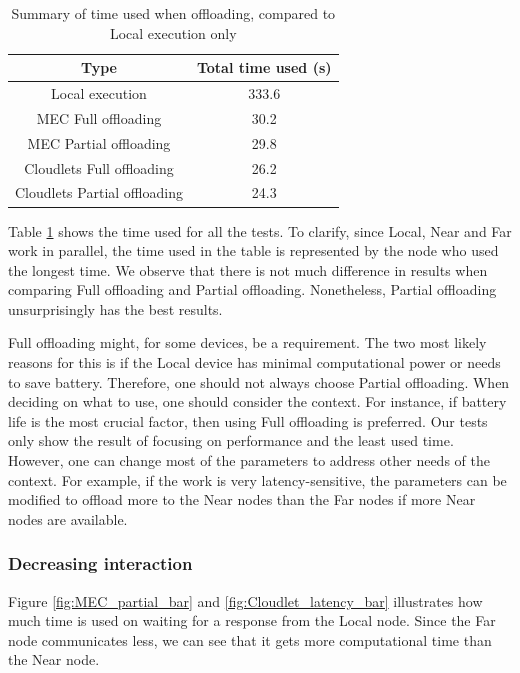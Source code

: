 \begin{table}[]
    \centering
    \begin{tabular}{c|c}

       Type  & Total time used (s)\\
       \hline

       Local execution                         & 333.6  \\

       MEC Full offloading       & 30.2 \\

       MEC Partial offloading    & 29.8 \\

       Cloudlets Full offloading & 26.2 \\
 
       Cloudlets Partial offloading  & 24.3 \\

    \end{tabular}
    \caption{Summary of time used when offloading, compared to Local execution only}
    \label{tab:total_time_compare}
\end{table}
Table \ref{tab:total_time_compare} shows the time used for all the tests. To clarify, since Local, Near and Far work in parallel, the time used in the table is represented by the node who used the longest time. We observe that there is not much difference in results when comparing Full offloading and Partial offloading. Nonetheless, Partial offloading unsurprisingly has the best results.

Full offloading might, for some devices, be a requirement. The two most likely reasons for this is if the Local device has minimal computational power or needs to save battery. Therefore, one should not always choose Partial offloading. When deciding on what to use, one should consider the context. For instance, if battery life is the most crucial factor, then using Full offloading is preferred. Our tests only show the result of focusing on performance and the least used time. However, one can change most of the parameters to address other needs of the context. For example, if the work is very latency-sensitive, the parameters can be modified to offload more to the Near nodes than the Far nodes if more Near nodes are available.



\subsubsection{Decreasing interaction}
Figure \ref{fig:MEC_partial_bar} and \ref{fig:Cloudlet_latency_bar} illustrates how much time is used on waiting for a response from the Local node. Since the Far node communicates less, we can see that it gets more computational time than the Near node. 



